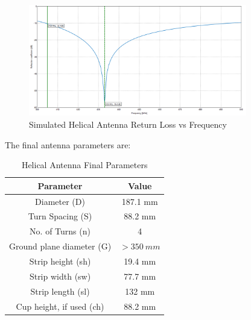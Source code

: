 \begin{figure}[!htb]
  \centering
  \includegraphics[width=0.85\textwidth]{helix7_returnLoss}
  \caption{Simulated Helical Antenna Return Loss vs Frequency}
  \label{fig:helix7_returnLoss}
\end{figure}

\newpage
The final antenna parameters are:
\begin{table}[!htb]
  \centering
  \renewcommand{\arraystretch}{1.2}
  \begin{tabular}{ |c|c| }
  \hline
  \textbf{Parameter}                  & \textbf{Value}    \\
  \hline
  Diameter (D)                        & 187.1 mm          \\ \hline
  Turn Spacing (S)                    & 88.2 mm           \\ \hline
  No. of Turns (n)                    & 4                 \\ \hline
  Ground plane diameter (G)           & $> \SI{350}{mm}$  \\ \hline
  Strip height (sh)                   & 19.4 mm          \\ \hline
  Strip width (sw)                    & 77.7 mm           \\ \hline
  Strip length (sl)                   & 132 mm           \\ \hline
  Cup height, if used (ch)            & 88.2 mm           \\ \hline
  \end{tabular}
  \caption{Helical Antenna Final Parameters}
  \label{tab:helicalParameters}
\end{table}